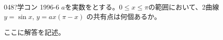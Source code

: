 \begin{prob}{048}{\hosi ?}{学コン 1996-6}
 $a$を実数をとする。$0\le x \le \pi$の範囲において、2曲線 $y=\sin x$, $y=ax(\pi-x)$ の共有点は何個あるか。
\end{prob}
ここに解答を記述。